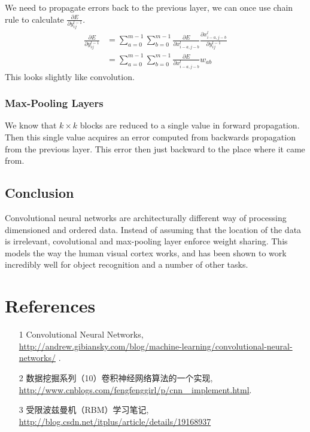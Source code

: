 \documentclass[UTF8]{ctexart}
\begin{document}
\par
We need to propagate errors back to the previous layer, we can once use
chain rule to calculate $\frac{\partial E}{\partial y_{ij}^{l-1}}$.
\begin{align}
\frac{\partial E}{\partial y_{ij}^{l-1}} 
&= \sum_{a=0}^{m-1} \sum_{b=0}^{m-1} \frac{\partial E}{\partial x_{i-a,j-b}^l} 
   \frac{\partial x_{i-a,j-b}^l}{\partial y_{ij}^{l-1}}
\\
&= \sum_{a=0}^{m-1} \sum_{b=0}^{m-1} \frac{\partial E}{\partial x_{i-a,j-b}^l} w_{ab}
\end{align}
This looks slightly like convolution.

\subsubsection{Max-Pooling Layers}
We know that $k \times k$ blocks are reduced to a single value in forward propagation.
Then this single value acquires an error computed from backwards propagation from the 
previous layer. This error then just backward to the place where it came from.

\subsection{Conclusion}
Convolutional neural networks are architecturally different way of processing dimensioned
and ordered data. Instead of assuming that the location of the data is irrelevant, covolutional
and max-pooling layer enforce weight sharing. This models the way the human visual cortex works,
and has been shown to work incredibly well for object recognition and a number of other tasks. 

\section{References}
\begin{itemize}
\item[1] Convolutional Neural Networks, \\
\url{http://andrew.gibiansky.com/blog/machine-learning/convolutional-neural-networks/} .
\item[2] 数据挖掘系列（10）卷积神经网络算法的一个实现, \\
\url{http://www.cnblogs.com/fengfenggirl/p/cnn\_ implement.html}.
\item[3] 受限波兹曼机（RBM）学习笔记, \\
\url{http://blog.csdn.net/itplus/article/details/19168937}
\end{itemize}
\end{document}
